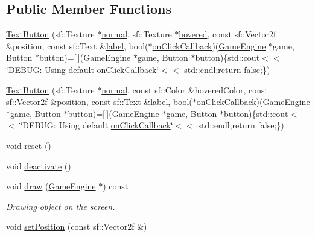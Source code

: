 \subsection*{Public Member Functions}
\begin{DoxyCompactItemize}
\item 
\mbox{\hyperlink{class_text_button_abb0c1feb5fef0f0716045cae77fe1a42}{Text\+Button}} (sf\+::\+Texture $\ast$\mbox{\hyperlink{class_button_a5a2a5e1c6b378762f5b2fe39e9053d9e}{normal}}, sf\+::\+Texture $\ast$\mbox{\hyperlink{class_button_a181477cb3462763b510a30a4f27cd756}{hovered}}, const sf\+::\+Vector2f \&position, const sf\+::\+Text \&\mbox{\hyperlink{class_text_button_af83f98d5e8997c8ddd7f47088ad6159b}{label}}, bool($\ast$\mbox{\hyperlink{class_button_abd70dfccd5cce2eb6d4cae1d684107c3}{on\+Click\+Callback}})(\mbox{\hyperlink{class_game_engine}{Game\+Engine}} $\ast$game, \mbox{\hyperlink{class_button}{Button}} $\ast$button)=\mbox{[}$\,$\mbox{]}(\mbox{\hyperlink{class_game_engine}{Game\+Engine}} $\ast$game, \mbox{\hyperlink{class_button}{Button}} $\ast$button)\{std\+::cout$<$$<$ \char`\"{}D\+E\+B\+U\+G\+: Using default \mbox{\hyperlink{class_button_abd70dfccd5cce2eb6d4cae1d684107c3}{on\+Click\+Callback}}\char`\"{}$<$$<$ std\+::endl;return false;\})
\item 
\mbox{\hyperlink{class_text_button_a31beb0aab9b5f05ebe7f8141632b2eea}{Text\+Button}} (sf\+::\+Texture $\ast$\mbox{\hyperlink{class_button_a5a2a5e1c6b378762f5b2fe39e9053d9e}{normal}}, const sf\+::\+Color \&hovered\+Color, const sf\+::\+Vector2f \&position, const sf\+::\+Text \&\mbox{\hyperlink{class_text_button_af83f98d5e8997c8ddd7f47088ad6159b}{label}}, bool($\ast$\mbox{\hyperlink{class_button_abd70dfccd5cce2eb6d4cae1d684107c3}{on\+Click\+Callback}})(\mbox{\hyperlink{class_game_engine}{Game\+Engine}} $\ast$game, \mbox{\hyperlink{class_button}{Button}} $\ast$button)=\mbox{[}$\,$\mbox{]}(\mbox{\hyperlink{class_game_engine}{Game\+Engine}} $\ast$game, \mbox{\hyperlink{class_button}{Button}} $\ast$button)\{std\+::cout$<$$<$ \char`\"{}D\+E\+B\+U\+G\+: Using default \mbox{\hyperlink{class_button_abd70dfccd5cce2eb6d4cae1d684107c3}{on\+Click\+Callback}}\char`\"{}$<$$<$ std\+::endl;return false;\})
\item 
void \mbox{\hyperlink{class_text_button_aed840bcd62454c1233d4eadaa8b6e3b5}{reset}} ()
\item 
void \mbox{\hyperlink{class_text_button_a8b0c38245988615e9cae8795b2f177cd}{deactivate}} ()
\item 
void \mbox{\hyperlink{class_text_button_a8af6b4a6e9084f157ffb015d29a02fcf}{draw}} (\mbox{\hyperlink{class_game_engine}{Game\+Engine}} $\ast$) const
\begin{DoxyCompactList}\small\item\em Drawing object on the screen. \end{DoxyCompactList}\item 
void \mbox{\hyperlink{class_text_button_a4550c33ce65f77b9e9e119526bfcc357}{set\+Position}} (const sf\+::\+Vector2f \&)
\end{DoxyCompactItemize}
